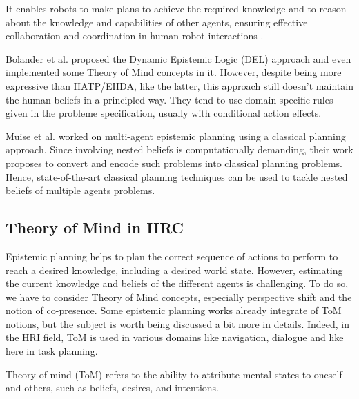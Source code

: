     It enables robots to make plans to achieve the required knowledge and to reason about the knowledge and capabilities of other agents, ensuring effective collaboration and coordination in human-robot interactions \cite{belle_epistemic_2023}.

    Bolander et al. proposed the Dynamic Epistemic Logic (DEL) approach \cite{bolander_gentle_2017} and even implemented some Theory of Mind concepts in it. However, despite being more expressive than HATP/EHDA, like the latter, this approach still doesn't maintain the human beliefs in a principled way. They tend to use domain-specific rules given in the probleme specification, usually with conditional action effects. 

    Muise et al. worked on multi-agent epistemic planning using a classical planning approach. Since involving nested beliefs is computationally demanding, their work proposes to convert and encode such problems into classical planning problems. Hence, state-of-the-art classical planning techniques can be used to tackle nested beliefs of multiple agents problems. 

    \subsection{Theory of Mind in HRC}
    Epistemic planning helps to plan the correct sequence of actions to perform to reach a desired knowledge, including a desired world state. However, estimating the current knowledge and beliefs of the different agents is challenging. To do so, we have to consider Theory of Mind concepts, especially perspective shift and the notion of co-presence. Some epistemic planning works already integrate of ToM notions, but the subject is worth being discussed a bit more in details. Indeed, in the HRI field, ToM is used in various domains like navigation, dialogue and like here in task planning. 

    Theory of mind (ToM) refers to the ability to attribute mental states to oneself and others, such as beliefs, desires, and intentions. 
    

